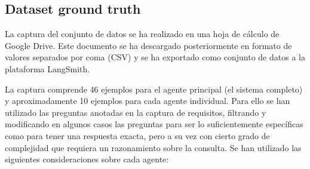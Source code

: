 \subsection{Dataset ground truth}
\label{sec:dataset}
La captura del conjunto de datos se ha realizado en una hoja de cálculo de Google Drive. Este documento se ha descargado posteriormente en formato de valores separados por coma (CSV) y se ha exportado como conjunto de datos a la plataforma LangSmith.

La captura comprende 46 ejemplos para el agente principal (el sistema completo) y aproximadamente 10 ejemplos para cada agente individual. Para ello se han utilizado las preguntas anotadas en la captura de requisitos, filtrando y modificando en algunos casos las preguntas para ser lo suficientemente específicas como para tener una respuesta exacta, pero a su vez con cierto grado de complejidad que requiera un razonamiento sobre la consulta. Se han utilizado las siguientes consideraciones sobre cada agente:

